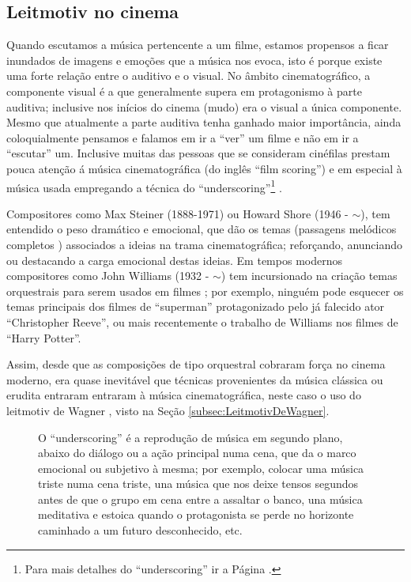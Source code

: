 \subsection{Leitmotiv no cinema}
\label{subsec:LeitmotivCine}

Quando escutamos a música pertencente a um filme, 
estamos propensos a ficar inundados de imagens e emoções que a música nos evoca,
isto é porque existe uma forte relação entre o auditivo e o visual.
No âmbito cinematográfico, a componente visual é a que generalmente supera em protagonismo à parte auditiva;
inclusive nos inícios do cinema (mudo) era o visual a única componente.
Mesmo que atualmente a parte auditiva tenha ganhado maior importância,
ainda coloquialmente pensamos e falamos em ir a ``ver'' um filme e não em ir a ``escutar'' um.
Inclusive muitas das pessoas que se consideram cinéfilas prestam pouca atenção 
á música cinematográfica (do inglês ``film scoring'') 
e em especial à música usada empregando a técnica do ``underscoring''\footnote{Para 
mais detalhes do ``underscoring'' ir a Página \pageref{page:underscoring}. } \cite[pp. 255]{bribitzer2015understanding}.

Compositores como Max Steiner (1888-1971) \cite[pp. 194]{nasta2004perspective} 
ou  Howard Shore (1946 - $\sim$), tem entendido o peso dramático e emocional,
que dão os temas (passagens melódicos completos \cite[pp. 1496]{latham2008diccionario}) associados a ideias na trama cinematográfica;
reforçando, anunciando ou destacando a carga emocional destas ideias.
Em tempos modernos compositores como John Williams (1932 - $\sim$) tem
incursionado na criação temas orquestrais para serem usados em filmes \cite[pp. 255-256]{bribitzer2015understanding};
por exemplo, ninguém pode esquecer os temas principais dos filmes de ``superman'' protagonizado pelo já falecido ator ``Christopher Reeve'',
ou mais recentemente o trabalho de Williams nos filmes de ``Harry Potter''.

Assim, desde que as composições de tipo orquestral cobraram força no cinema moderno,
era quase inevitável que  técnicas provenientes da música clássica ou erudita entraram entraram à música cinematográfica,
neste caso o uso do leitmotiv de Wagner \cite[pp. 256]{bribitzer2015understanding}, visto na Seção \ref{subsec:LeitmotivDeWagner}.



\begin{figure}[t]
\begin{elaboracion}[title=Que é o ``underscoring''?]
\label{ref:Underscoring}
O ``underscoring'' é a reprodução de música em segundo plano, abaixo do diálogo ou a ação principal numa cena,
que da o marco emocional ou subjetivo à mesma;
por exemplo, colocar uma música triste numa cena triste, 
una música que nos deixe tensos segundos antes de que o grupo em cena entre a assaltar o banco, 
una música meditativa e estoica quando o protagonista se perde no horizonte caminhado a um futuro desconhecido, etc.
\end{elaboracion}
\label{page:underscoring}
\end{figure}

